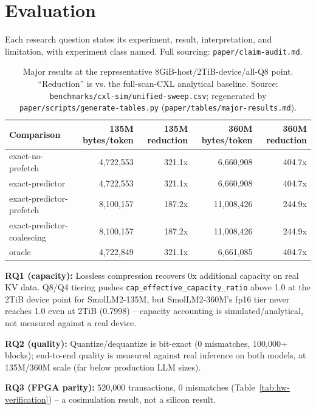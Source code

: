 \documentclass[11pt]{article}
\begin{document}
\section{Evaluation}
\label{sec:eval}

Each research question states its experiment, result, interpretation,
and limitation, with experiment class named. Full sourcing:
\texttt{paper/claim-audit.md}.

\begin{table}[h]
\centering
\small
\begin{tabular}{@{}lrrrr@{}}
\toprule
Comparison & 135M bytes/token & 135M reduction & 360M bytes/token & 360M reduction \\
\midrule
exact-no-prefetch          & 4{,}722{,}553  & 321.1x & 6{,}660{,}908  & 404.7x \\
exact-predictor            & 4{,}722{,}553  & 321.1x & 6{,}660{,}908  & 404.7x \\
exact-predictor-prefetch   & 8{,}100{,}157  & 187.2x & 11{,}008{,}426 & 244.9x \\
exact-predictor-coalescing & 8{,}100{,}157  & 187.2x & 11{,}008{,}426 & 244.9x \\
oracle                     & 4{,}722{,}849  & 321.1x & 6{,}661{,}085  & 404.7x \\
\bottomrule
\end{tabular}
\caption{Major results at the representative 8GiB-host/2TiB-device/all-Q8
point. ``Reduction'' is vs. the full-scan-CXL analytical baseline.
Source: \texttt{benchmarks/cxl-sim/unified-sweep.csv}; regenerated by
\texttt{paper/scripts/generate-tables.py} (\texttt{paper/tables/major-results.md}).}
\label{tab:major-results}
\end{table}

\textbf{RQ1 (capacity):} Lossless compression recovers 0x additional
capacity on real KV data. Q8/Q4 tiering pushes
\texttt{cap\_effective\_capacity\_ratio} above 1.0 at the 2TiB device
point for SmolLM2-135M, but SmolLM2-360M's fp16 tier never reaches 1.0
even at 2TiB (0.7998) -- capacity accounting is simulated/analytical,
not measured against a real device.

\textbf{RQ2 (quality):} Quantize/dequantize is bit-exact (0 mismatches,
100{,}000+ blocks); end-to-end quality is measured against real
inference on both models, at 135M/360M scale (far below production LLM
sizes).

\textbf{RQ3 (FPGA parity):} 520{,}000 transactions, 0 mismatches
(Table~\ref{tab:hw-verification}) -- a cosimulation result, not a
silicon result.
\end{document}
